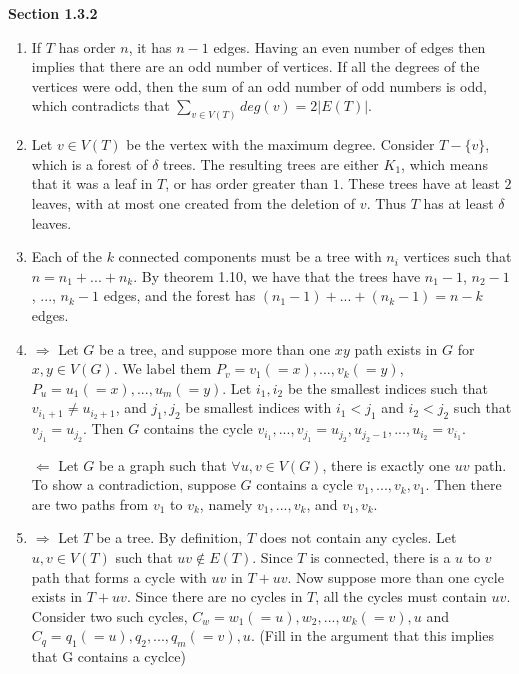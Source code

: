 \documentclass[11pt]{article}
\begin{document}
{\bfseries Section 1.3.2}

\begin{enumerate}[1]
    \addtocounter{enumi}{1}
    \item 
        If $T$ has order $n$, it has $n - 1$ edges. Having an even number of 
        edges 
        then implies that there are an odd number of vertices. If all the degrees 
        of the vertices were odd, then the sum of an odd number of odd numbers is
        odd, which contradicts that $\sum_{v \in V(T)} deg(v) = 2|E(T)|$.
    \item
        Let $v \in V(T)$ be the vertex with the maximum degree. Consider 
        $T - \{v\}$, which is a forest of $\delta$ trees. The resulting 
        trees are either $K_1$, which means that it was a leaf in $T$, or has 
        order greater than $1$. These trees have at least $2$ leaves, with at most 
        one created from the deletion of $v$. Thus $T$ has at least $\delta$ leaves.
    \item
        Each of the $k$ connected components must be a tree with $n_i$ vertices 
        such that $n = n_1 + ... + n_k$. By theorem 1.10, we have that the trees 
        have $n_1 - 1$, $n_2 - 1$, ..., $n_k - 1$ edges, and the forest has 
        $(n_1 - 1) + ... + (n_k - 1) = n - k$ edges.
    \item %
        $\Rightarrow$ Let $G$ be a tree, and suppose more than one $xy$ path
        exists in $G$ for $x,y \in V(G)$. We label them 
        $P_v = v_1 (= x), ..., v_k (= y)$, 
        $P_u = u_1 (= x), ..., u_m (= y)$. Let $i_1, i_2$ be the 
        smallest indices such that $v_{i_1 + 1} \neq u_{i_2 + 1}$, and $j_1, j_2$ 
        be smallest indices with $i_1 < j_1$ and $i_2 < j_2$ such that 
        $v_{j_1} = u_{j_2}$. Then $G$ contains the cycle
        $v_{i_1}, ..., v_{j_1} = u_{j_2}, u_{j_2 - 1}, ..., u_{i_2} = v_{i_1}$. 
        
        $\Leftarrow$ Let $G$ be a graph such that $\forall u,v \in V(G)$, there 
        is exactly one $uv$ path. To show a contradiction, suppose $G$ contains 
        a cycle $v_1, ..., v_k, v_1$. Then there are two paths from $v_1$ to 
        $v_k$, namely $v_1, ..., v_k$, and $v_1, v_k$. 

    \item %
        $\Rightarrow$ Let $T$ be a tree. By definition, $T$ does not contain 
        any cycles. Let $u,v \in V(T)$ such that $uv \notin E(T)$. Since $T$
        is connected, there is a $u$ to $v$ path that forms a cycle with $uv$ in 
        $T + uv$. Now suppose more than one cycle exists in $T + uv$. Since
        there are no cycles in $T$, all the cycles must contain $uv$. Consider
        two such cycles, $C_w = w_1 (= u), w_2, ..., w_k (= v), u$ and 
        $C_q = q_1 (= u), q_2, ..., q_m (= v), u$. (Fill in the argument that
        this implies that G contains a cyclce) 


\end{enumerate}
\end{document}
